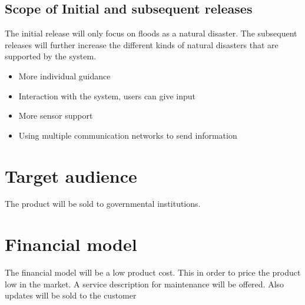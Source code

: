 \subsection{Scope of Initial and subsequent releases}
The initial release will only focus on floods as a natural disaster. The subsequent releases will further increase the different kinds of natural disasters that are supported by the system.\\

	\begin{itemize}
		\item More individual guidance
		\item Interaction with the system, users can give input
		\item More sensor support
		\item Using multiple communication networks to send information
	\end{itemize}

\section{Target audience}
The product will be sold to governmental institutions.

\section{Financial model}
The financial model will be a low product cost. This in order to price the product low in the market. A service description for maintenance will be offered. Also updates will be sold to the customer




